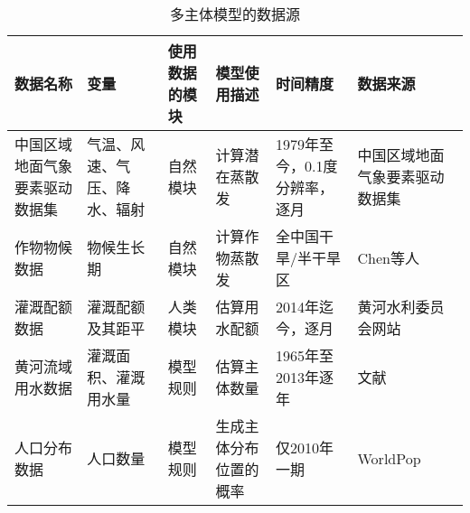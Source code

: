 \begin{table}[htbp]
    \centering
    \caption{多主体模型的数据源}
      \begin{tabularx}{\textwidth}{p{2.5cm}LLLLL}
      \toprule
      数据名称  & 变量    & 使用数据的模块 & 模型使用描述 & 时间精度  & 数据来源 \\
      \midrule
      中国区域地面气象要素驱动数据集 & 气温、风速、气压、降水、辐射 & 自然模块  & 计算潜在蒸散发 & 1979年至今，0.1度分辨率，逐月 & 中国区域地面气象要素驱动数据集~\cite{data_yang} \\
      作物物候数据 & 物候生长期 & 自然模块  & 计算作物蒸散发 & 全中国干旱/半干旱区 & Chen等人~\cite{chen2023}\\
      灌溉配额数据 & 灌溉配额及其距平 & 人类模块  & 估算用水配额 & 2014年迄今，逐月 & 黄河水利委员会网站 \\
      黄河流域用水数据 & 灌溉面积、灌溉用水量 & 模型规则  & 估算主体数量 & 1965年至2013年逐年 & 文献\cite{zhou2020} \\
      人口分布数据 & 人口数量  & 模型规则  & 生成主体分布位置的概率 & 仅2010年一期 & WorldPop\cite{worldpop2020} \\
      \bottomrule
      \end{tabularx}%
    \label{ch6:tab:dataset}%
  \end{table}%
  